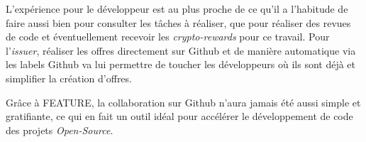 \documentclass[
	a4paper, %
	10pt, %
	unnumberedsections, %
	twoside, %
]{LTJournalArticle}
\begin{document}
L'expérience pour le développeur est au plus proche de ce qu'il a l'habitude de faire aussi bien pour consulter les tâches à réaliser, que pour réaliser des revues de code et éventuellement recevoir les \emph{crypto-rewards} pour ce travail. Pour l'\emph{issuer}, réaliser les offres directement sur Github et de manière automatique via les labels Github va lui permettre de toucher les développeurs où ils sont déjà et simplifier la création d'offres.

Grâce à FEATURE, la collaboration sur Github n'aura jamais été aussi simple et gratifiante, ce qui en fait un outil idéal pour accélérer le développement de code des projets \emph{Open-Source}.
\end{document}
